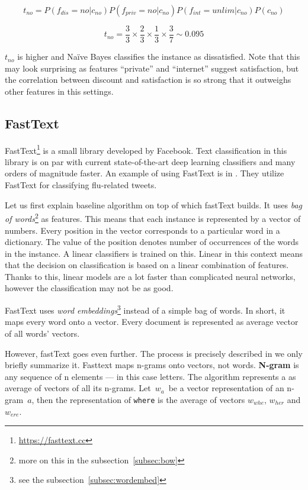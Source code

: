 \begin{equation}
	t_{no} = 
	P\left(  f_{dis} = no | c_{no} \right)
	P\left(  f_{priv} = no | c_{no} \right)
	P\left(  f_{int} = unlim | c_{no} \right)
	P\left( c_{no} \right)
\end{equation}

\begin{equation}
	t_{no} = 
	\frac{3}{3} \times
	\frac{2}{3} \times
	\frac{1}{3} \times
	\frac{3}{7}
	\sim 0.095
\end{equation}

$t_{no}$ is higher and Na\"{i}ve Bayes classifies the instance as dissatisfied.
Note that this may look surprising as features ``private'' and ``internet'' suggest satisfaction,
but the correlation between discount and satisfaction is so strong that it outweighs other features in this settings.

\subsection{FastText}

FastText\footnote{\url{https://fasttext.cc}} \citep{Joulin2017bag} is a small library developed by Facebook.
Text classification in this library is on par with current state-of-the-art deep learning classifiers
and many orders of magnitude faster.
An example of using FastText is in \citet{alessa2018text}.
They utilize FastText for classifying flu-related tweets.

Let us first explain  baseline algorithm on top of which fastText builds.
It uses {\it bag of words}\footnote{more on this in the subsection~\ref{subsec:bow}} as features.
This means that each instance is represented by a vector of numbers.
Every position in the vector corresponds to a particular word in a dictionary.
The value of the position denotes number of occurrences of the words in the instance.
A linear classifiers is trained on this.
Linear in this context means that the decision on classification is based on a linear combination of features.
Thanks to this, linear models are a lot faster than complicated neural networks, however the classification may not be as good.

FastText uses {\it word embeddings}\footnote{see the subsection~\ref{subsec:wordembed}} instead of a simple bag of words.
In short, it maps every word onto a  vector. Every document is represented as  average vector of all words' vectors.

However, fastText goes even further.
The process is precisely described in \citet{Bojanowski2017enriching}
we only briefly summarize it.
Fasttext maps n-grams onto vectors, not words.
{\bf N-gram} is any sequence of n elements --- in this case letters.
The algorithm represents a  as  average of vectors of all its  n-grams.
Let~$w_{a}$~be a vector representation of an n-gram~$a$, then 
the representation of \texttt{where} is the average of vectors
$w_{whe}$, 
$w_{her}$ and
$w_{ere}$.


